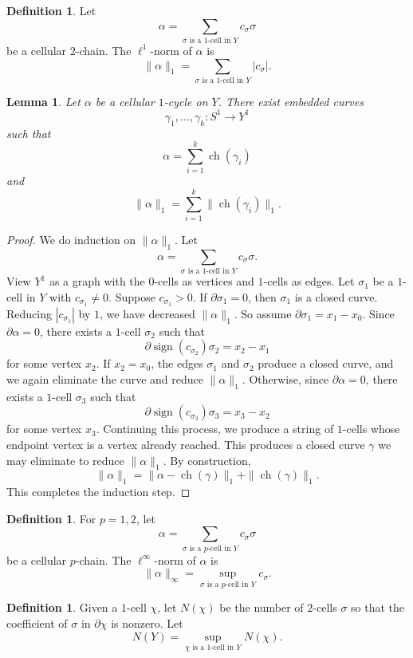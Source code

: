 \documentclass[12pt]{amsart}
\DeclareMathOperator*{\ch}{ch}
\DeclareMathOperator*{\sign}{sign}
\newtheorem{lemma}[theorem]{Lemma}
\theoremstyle{definition}
\newtheorem{definition}[theorem]{Definition}
\begin{document}
\begin{definition} Let $$\alpha=\sum_{\sigma \text{ is a }1\text{-cell in } Y}c_\sigma \sigma$$ be a cellular $2$-chain. The $\ell^1$-norm of $\alpha$ is $$\|\alpha\|_1=\sum_{\sigma \text{ is a }1\text{-cell in } Y}|c_\sigma|.$$
\end{definition}

\begin{lemma}\label{curves associated to cycle} Let $\alpha$ be a cellular $1$-cycle on $Y$. There exist embedded curves $$\gamma_1,...,\gamma_k:S^1\to Y^1$$ such that $$\alpha=\sum_{i=1}^k \ch(\gamma_i)$$ and $$\|\alpha\|_1= \sum_{i=1}^k \|\ch(\gamma_i)\|_1.$$
\end{lemma}

\begin{proof} We do induction on $\|\alpha\|_1$. Let $$\alpha=\sum_{\sigma \text{ is a }1\text{-cell in } Y}c_\sigma \sigma.$$ View $Y^1$ as a graph with the $0$-cells as vertices and $1$-cells as edges. Let $\sigma_1$ be a $1$-cell in $Y$ with $c_{\sigma_1}\neq 0$. Suppose $c_{\sigma_1}>0$. If $\partial \sigma_1=0$, then $\sigma_1$ is a closed curve. Reducing $|c_{\sigma_1}|$ by $1$, we have decreased $\|\alpha\|_1$. So assume $\partial \sigma_1=x_1-x_0$. Since $\partial \alpha=0$, there exists a $1$-cell $\sigma_2$ such that $$\partial \sign(c_{\sigma_2})\sigma_2=x_2-x_1$$ for some vertex $x_2$. If $x_2=x_0$, the edges $\sigma_1$ and $\sigma_2$ produce a closed curve, and we again eliminate the curve and reduce $\|\alpha\|_1$. Otherwise, since $\partial \alpha=0$, there exists a $1$-cell $\sigma_3$ such that $$\partial \sign(c_{\sigma_3})\sigma_3=x_3-x_2$$ for some vertex $x_3$. Continuing this process, we produce a string of $1$-cells whose endpoint vertex is a vertex already reached. This produces a closed curve $\gamma$ we may eliminate to reduce $\|\alpha\|_1$. By construction, $$\|\alpha\|_1=\|\alpha-\ch(\gamma)\|_1+\|\ch(\gamma)\|_1.$$ This completes the induction step.
\end{proof}

\begin{definition} For $p=1,2$, let $$\alpha=\sum_{\sigma \text{ is a }p\text{-cell in } Y}c_\sigma \sigma$$ be a cellular $p$-chain. The $\ell^\infty$-norm of $\alpha$ is $$\|\alpha\|_\infty=\sup_{\sigma \text{ is a }p\text{-cell in } Y} c_\sigma.$$
\end{definition}

\begin{definition} \label{def of N} Given a $1$-cell $\chi$, let $N(\chi)$ be the number of $2$-cells $\sigma$ so that the coefficient of $\sigma$ in $\partial \chi$ is nonzero. Let $$N(Y)=\sup_{\chi \text{ is a }1\text{-cell in } Y}N(\chi).$$ 
\end{definition}
\end{document}

